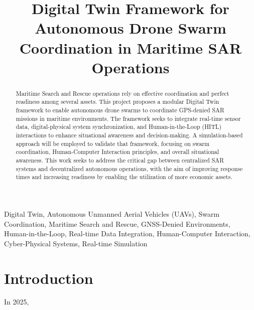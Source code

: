 \documentclass[conference]{IEEEtran}
\begin{document}
    \title{Digital Twin Framework for Autonomous Drone Swarm Coordination in Maritime SAR Operations}

    \author{
    }

    \maketitle

    \begin{abstract}
        Maritime Search and Rescue operations rely on effective coordination and perfect readiness among several assets.
        This project proposes a modular Digital Twin framework to enable autonomous drone swarms to coordinate GPS-denied SAR missions in maritime environments.
        The framework seeks to integrate real-time sensor data, digital-physical system synchronization, and Human-in-the-Loop (HITL) interactions to enhance situational awareness and decision-making.
        A simulation-based approach will be employed to validate that framework, focusing on swarm coordination, Human-Computer Interaction principles, and overall situational awareness.
        This work seeks to address the critical gap between centralized SAR systems and decentralized autonomous operations, with the aim of improving response times and increasing readiness by enabling the utilization of more economic assets.
    \end{abstract}

    \begin{IEEEkeywords}
        Digital Twin, Autonomous Unmanned Aerial Vehicles (UAVs), Swarm Coordination, Maritime Search and Rescue, GNSS-Denied Environments, Human-in-the-Loop, Real-time Data Integration, Human-Computer Interaction, Cyber-Physical Systems, Real-time Simulation
    \end{IEEEkeywords}

    \section{Introduction}\label{sec:introduction}
        In 2025,

    
    
\end{document}
